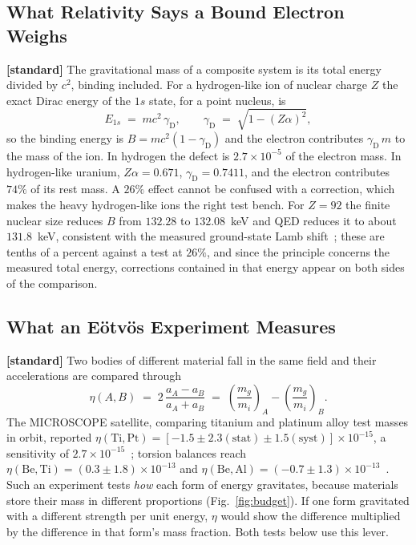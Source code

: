 \documentclass[%
 reprint, amsmath,amssymb, aps, prb, ]{revtex4-2}
\numberwithin{equation}{section}
\newcommand{\gammaD}{\gamma_{\text{D}}}
\begin{document}
\subsection{What Relativity Says a Bound Electron Weighs}
\label{subsec:primer_bound}

\textbf{[standard]} The gravitational mass of a composite system is its total energy divided by $c^{2}$, binding included. For a hydrogen-like ion of nuclear charge $Z$ the exact Dirac energy of the $1s$ state, for a point nucleus, is
\begin{equation}
E_{1s} \;=\; mc^{2}\,\gammaD, \qquad \gammaD \;=\; \sqrt{1 - (Z\alpha)^{2}},
\label{eq:EDirac}
\end{equation}
so the binding energy is $B = mc^{2}(1-\gammaD)$ and the electron contributes $\gammaD\,m$ to the mass of the ion. In hydrogen the defect is $2.7\times10^{-5}$ of the electron mass. In hydrogen-like uranium, $Z\alpha = 0.671$, $\gammaD = 0.7411$, and the electron contributes $74\%$ of its rest mass. A $26\%$ effect cannot be confused with a correction, which makes the heavy hydrogen-like ions the right test bench. For $Z = 92$ the finite nuclear size reduces $B$ from $132.28$ to $132.08$~keV and QED reduces it to about $131.8$~keV, consistent with the measured ground-state Lamb shift~\cite{gumberidze2005}; these are tenths of a percent against a test at $26\%$, and since the principle concerns the measured total energy, corrections contained in that energy appear on both sides of the comparison.

\subsection{What an E\"otv\"os Experiment Measures}
\label{subsec:primer_eotvos}

\textbf{[standard]} Two bodies of different material fall in the same field and their accelerations are compared through
\begin{equation}
\eta(A,B) \;=\; 2\,\frac{a_A - a_B}{a_A + a_B}
\;=\; \left(\frac{m_g}{m_i}\right)_{\!A} - \left(\frac{m_g}{m_i}\right)_{\!B}.
\label{eq:eta}
\end{equation}
The MICROSCOPE satellite, comparing titanium and platinum alloy test masses in orbit, reported $\eta(\mathrm{Ti},\mathrm{Pt}) = [-1.5 \pm 2.3(\text{stat}) \pm 1.5(\text{syst})]\times10^{-15}$, a sensitivity of $2.7\times10^{-15}$~\cite{microscope2022}; torsion balances reach $\eta(\mathrm{Be},\mathrm{Ti}) = (0.3\pm1.8)\times10^{-13}$ and $\eta(\mathrm{Be},\mathrm{Al}) = (-0.7\pm1.3)\times10^{-13}$~\cite{schlamminger2008,wagner2012}. Such an experiment tests \emph{how} each form of energy gravitates, because materials store their mass in different proportions (Fig.~\ref{fig:budget}). If one form gravitated with a different strength per unit energy, $\eta$ would show the difference multiplied by the difference in that form's mass fraction. Both tests below use this lever.
\end{document}

